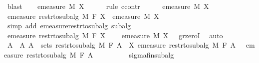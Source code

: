 \begin{isabellebody}
\ blast\isanewline
\ \ \isamarkupfalse%
\ {\isachardoublequoteopen}emeasure\ M\ X\ {\isacharequal}{\kern0pt}\ {}{\isachardoublequoteclose}\isanewline
\ \ \isamarkupfalse%
\ {\isacharparenleft}{\kern0pt}rule\ ccontr{\isacharparenright}{\kern0pt}\isanewline
\ \ \ \ \isamarkupfalse%
\ {\isachardoublequoteopen}emeasure\ M\ X\ {\isasymnoteq}\ {}{\isachardoublequoteclose}\isanewline
\ \ \ \ \isamarkupfalse%
\ {\isachardoublequoteopen}emeasure\ {\isacharparenleft}{\kern0pt}restr{\isacharunderscore}{\kern0pt}to{\isacharunderscore}{\kern0pt}subalg\ M\ F{\isacharparenright}{\kern0pt}\ X\ {\isacharequal}{\kern0pt}\ emeasure\ M\ X{\isachardoublequoteclose}\ \isamarkupfalse%
\ {\isacharparenleft}{\kern0pt}simp\ add{\isacharcolon}{\kern0pt}\ emeasure{\isacharunderscore}{\kern0pt}restr{\isacharunderscore}{\kern0pt}to{\isacharunderscore}{\kern0pt}subalg\ subalg{\isacharparenright}{\kern0pt}\isanewline
\ \ \ \ \isamarkupfalse%
\ {\isachardoublequoteopen}emeasure\ {\isacharparenleft}{\kern0pt}restr{\isacharunderscore}{\kern0pt}to{\isacharunderscore}{\kern0pt}subalg\ M\ F{\isacharparenright}{\kern0pt}\ X\ {\isachargreater}{\kern0pt}\ {}{\isachardoublequoteclose}\ \isamarkupfalse%
\ {\isacartoucheopen}{\isasymnot}{\isacharparenleft}{\kern0pt}emeasure\ M\ X{\isacharparenright}{\kern0pt}\ {\isacharequal}{\kern0pt}\ {}{\isacartoucheclose}\ gr{\isacharunderscore}{\kern0pt}zeroI\ \isamarkupfalse%
\ auto\isanewline
\ \ \ \ \isamarkupfalse%
\ \isamarkupfalse%
\ A\ \ A{\isacharcolon}{\kern0pt}\ {\isachardoublequoteopen}A\ {\isasymin}\ sets\ {\isacharparenleft}{\kern0pt}restr{\isacharunderscore}{\kern0pt}to{\isacharunderscore}{\kern0pt}subalg\ M\ F{\isacharparenright}{\kern0pt}{\isachardoublequoteclose}\ {\isachardoublequoteopen}A\ {\isasymsubseteq}\ X{\isachardoublequoteclose}\ {\isachardoublequoteopen}emeasure\ {\isacharparenleft}{\kern0pt}restr{\isacharunderscore}{\kern0pt}to{\isacharunderscore}{\kern0pt}subalg\ M\ F{\isacharparenright}{\kern0pt}\ A\ {\isachargreater}{\kern0pt}\ {}{\isachardoublequoteclose}\ {\isachardoublequoteopen}emeasure\ {\isacharparenleft}{\kern0pt}restr{\isacharunderscore}{\kern0pt}to{\isacharunderscore}{\kern0pt}subalg\ M\ F{\isacharparenright}{\kern0pt}\ A\ {\isacharless}{\kern0pt}\ {\isasyminfinity}{\isachardoublequoteclose}\isanewline
\ \ \ \ \ \ \isamarkupfalse%
\ sigma{\isacharunderscore}{\kern0pt}fin{\isacharunderscore}{\kern0pt}subalg\ \isamarkupfalse%

\end{isabellebody}

